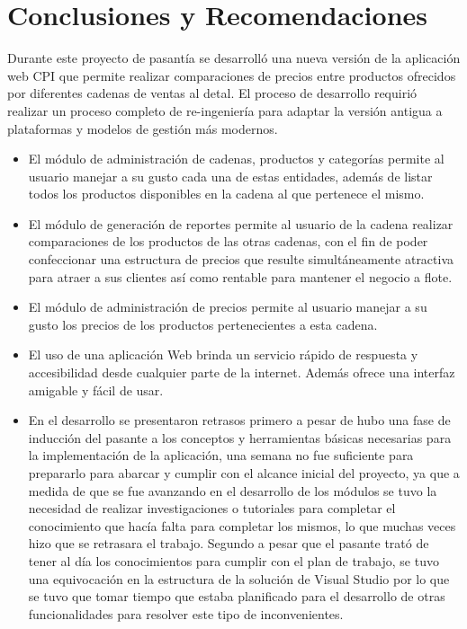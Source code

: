 \chapter*{Conclusiones y Recomendaciones}
Durante este proyecto de pasantía se desarrolló una nueva versión de la aplicación web CPI que permite realizar comparaciones de precios entre productos ofrecidos por diferentes cadenas de ventas al detal. El proceso de desarrollo requirió realizar un proceso completo de re-ingeniería para adaptar la versión antigua a plataformas y modelos de gestión más modernos.

\begin{itemize}
	\item El módulo de administración de cadenas, productos y categorías permite al usuario manejar a su gusto cada una de estas entidades, además de listar todos los productos disponibles en la cadena al que pertenece el mismo.
	\item El módulo de generación de reportes permite al usuario de la cadena realizar comparaciones de los productos de las otras cadenas, con el fin de poder confeccionar una estructura de precios que resulte simultáneamente atractiva para atraer a sus clientes así como rentable para mantener el negocio a flote. 
	\item El módulo de administración de precios permite al usuario manejar a su gusto los precios de los productos pertenecientes a esta cadena.
	\item El uso de una aplicación Web brinda un servicio rápido de respuesta y accesibilidad desde cualquier parte de la internet. Además ofrece una interfaz amigable y fácil de usar.
	\item En el desarrollo se presentaron retrasos primero a pesar de hubo una fase de inducción del pasante a los conceptos y herramientas básicas necesarias para la implementación de la aplicación, una semana no fue suficiente para prepararlo para abarcar y cumplir con el alcance inicial del proyecto, ya que a medida de que se fue avanzando en el desarrollo de los módulos se tuvo la necesidad de realizar investigaciones o tutoriales para completar el conocimiento que hacía falta para completar los mismos, lo que muchas veces hizo que se retrasara el trabajo. Segundo a pesar que el pasante trató de tener al día los conocimientos para cumplir con el plan de trabajo, se tuvo una equivocación en la estructura de la solución de Visual Studio por lo que se tuvo que tomar tiempo que estaba planificado para el desarrollo de otras funcionalidades para resolver este tipo de inconvenientes.

\end{itemize}
